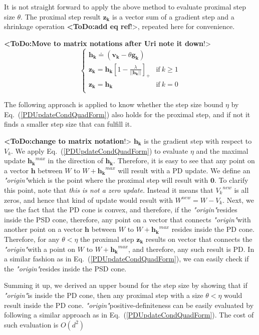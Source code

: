 \documentclass[twoside,11pt]{article}
\newcommand\todo[1]{\textbf{<ToDo:#1}!>}
\newcommand\mat[1]{{#1}}
\renewcommand\vec[1]{\mathbf{#1}}
\newcommand{\W}{\mat{W}}
\newcommand{\newW}{{\mat{W^{new}}}}
\newcommand{\eqdef}{\doteq}
\newcommand{\VVk}{\vec{v_k}}
\newcommand{\gk}{\vec{g_k}}
\newcommand{\hk}{\vec{h_k}}
\newcommand{\zk}{\vec{z_k}}
\newcommand{\Vk}{\mat{V_k}}
\renewcommand{\eqref}[1]{Eq.~(\ref{#1})}
\begin{document}
It is not straight forward to apply the above method to evaluate proximal step size $\theta$. The proximal step result $\zk$ is a vector sum of a gradient step and a shrinkage operation \todo{add eq ref}, repeated here for convenience. 

\todo{Move to matrix notations after Uri note it down}
\begin{equation*}
 \begin{cases}
   \hk \eqdef (\VVk-\theta \gk) \\ 
   \zk = \hk [1 - \frac{\lambda}{||\hk||}]_+ & \text{if}\  k \geq 1\\
   \zk = \hk & \text{if}\ k = 0 \\ 
 \end{cases}
\end{equation*}

The following approach is applied to know whether the step size bound $\eta$ by \eqref{PDUpdateCondQuadForm} also holds for the proximal step, and if not it finds a smaller step size that can fulfill it.


\newcommand{\Vkorigin}{\emph{"origin"}}
\todo{change to matrix notation}
$\hk$ is the gradient step with respect to $\Vk$. We apply \eqref{PDUpdateCondQuadForm} to evaluate $\eta$ and the maximal update $\hk^{max}$ in the direction of $\hk$. Therefore, it is easy to see that any point on a vector $\vec{h}$ between $\W$ to $\W + \hk^{max}$ will result with a PD update. We define an \Vkorigin which is the point where the proximal step will result with $\vec{0}$. To clarify this point, note that \emph{this is not a zero update.} Instead it means that $\Vk^{new}$ is all zeros, and hence that kind of update would result with $\newW = \W - \Vk$. Next, we use the fact that the PD cone is convex, and therefore, if the \Vkorigin resides inside the PSD cone, therefore, any point on a vector that connects \Vkorigin with another point on a vector $\vec{h}$ between $\W$ to $\W + \hk^{max}$ resides inside the PD cone. Therefore, for any $\theta < \eta$ the proximal step $\zk$ results on vector that connects the \Vkorigin with a point on $\W$ to $\W + \hk^{max}$, and therefore, any such result is PD. In a similar fashion as in \eqref{PDUpdateCondQuadForm}, we can easily check if the \Vkorigin resides inside the PSD cone.  

Summing it up, we derived an upper bound for the step size by showing that if \Vkorigin is inside the PD cone, then any proximal step with a size $\theta < \eta$ would result inside the PD cone. \Vkorigin positive-definiteness can be easily evaluated by following a similar approach as in \eqref{PDUpdateCondQuadForm}. The cost of such evaluation is $O(d^2)$
\end{document}
